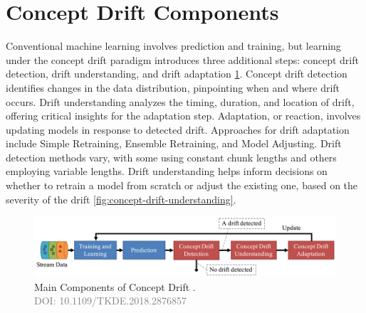  \section{Concept Drift Components}
\label{sec:background_concept_drift_components}
Conventional machine learning involves prediction and training, but learning under the concept drift paradigm introduces three additional steps: concept drift detection, drift understanding, and drift adaptation \ref{fig:concept-drift-components}. Concept drift detection identifies changes in the data distribution, pinpointing when and where drift occurs. Drift understanding analyzes the timing, duration, and location of drift, offering critical insights for the adaptation step. Adaptation, or reaction, involves updating models in response to detected drift. Approaches for drift adaptation include Simple Retraining, Ensemble Retraining, and Model Adjusting. Drift detection methods vary, with some using constant chunk lengths and others employing variable lengths. Drift understanding helps inform decisions on whether to retrain a model from scratch or adjust the existing one, based on the severity of the drift \ref{fig:concept-drift-understanding}.
 
\begin{figure}[!ht]
    \centering
    \includegraphics[width=.9\textwidth]{2_Background/figures/concept_drift_components.png}
    \caption{Main Components of Concept Drift \cite{8496795}. \\ \textcolor{gray}{\fontsize{10}{0}\selectfont DOI: 10.1109/TKDE.2018.2876857}}

    \label{fig:concept-drift-components}
\end{figure}


